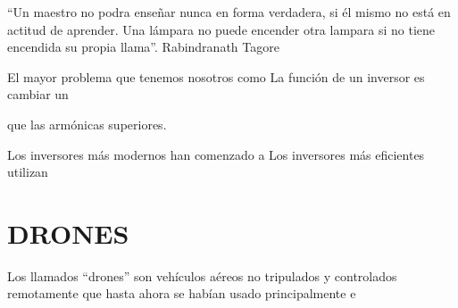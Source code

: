 \documentclass[12pt]{article}
\begin{document}
\vspace{15PT}
“Un maestro no podra enseñar nunca en forma verdadera, si él mismo no está en actitud de aprender. Una lámpara no puede encender otra lampara si no tiene encendida su propia llama”. Rabindranath Tagore

\vspace{15PT}
El mayor problema que tenemos nosotros como 
La función de un inversor es cambiar un 

\vspace{15PT}
que las armónicas superiores.

\vspace{15PT}
Los inversores más modernos han comenzado a 
\vspace{15PT}
Los inversores más eficientes utilizan 



\vspace{30pt}
\section{DRONES}

Los llamados “drones” son vehículos aéreos no tripulados y controlados remotamente que hasta ahora se habían usado principalmente e

 
\end{document}
